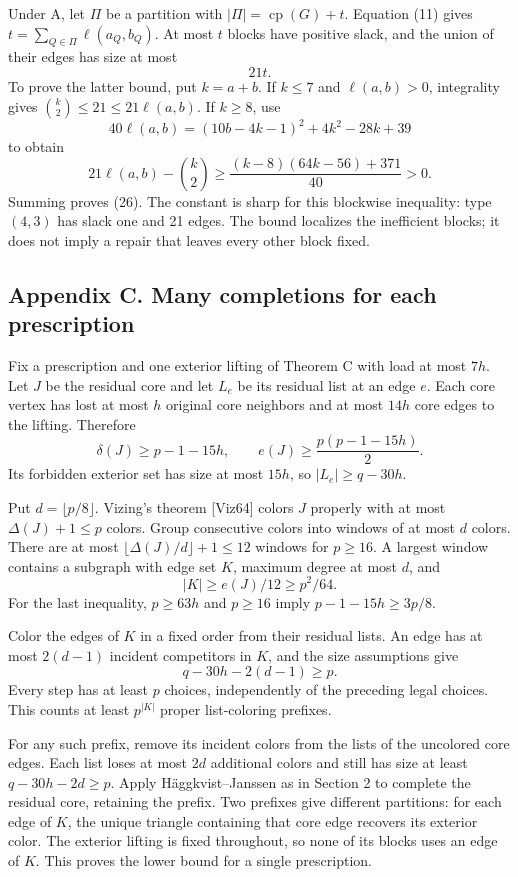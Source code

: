 \documentclass[english,11pt,a4paper]{article}
\newcounter{none}
\begin{document}
Under A, let \(\Pi\) be a partition with
\(|\Pi|=\operatorname{cp}(G)+t\). Equation (11) gives
\(t=\sum_{Q\in\Pi}\ell(a_Q,b_Q)\). At most \(t\) blocks have positive
slack, and the union of their edges has size at most \[
21t. \tag{26}
\] To prove the latter bound, put \(k=a+b\). If \(k\le7\) and
\(\ell(a,b)>0\), integrality gives \(\binom k2\le21\le21\ell(a,b)\). If
\(k\ge8\), use \[
40\ell(a,b)=(10b-4k-1)^2+4k^2-28k+39
\] to obtain \[
21\ell(a,b)-\binom k2
\ge\frac{(k-8)(64k-56)+371}{40}>0.
\] Summing proves (26). The constant is sharp for this blockwise
inequality: type \((4,3)\) has slack one and 21 edges. The bound
localizes the inefficient blocks; it does not imply a repair that leaves
every other block fixed.

\subsection{Appendix C. Many completions for each
prescription}\label{appendix-c.-many-completions-for-each-prescription}

Fix a prescription and one exterior lifting of Theorem C with load at
most \(7h\). Let \(J\) be the residual core and let \(L_e\) be its
residual list at an edge \(e\). Each core vertex has lost at most \(h\)
original core neighbors and at most \(14h\) core edges to the lifting.
Therefore \[
\delta(J)\ge p-1-15h,\qquad
e(J)\ge\frac{p(p-1-15h)}2.
\] Its forbidden exterior set has size at most \(15h\), so
\(|L_e|\ge q-30h\).

Put \(d=\lfloor p/8\rfloor\). Vizing's theorem {[}Viz64{]} colors \(J\)
properly with at most \(\Delta(J)+1\le p\) colors. Group consecutive
colors into windows of at most \(d\) colors. There are at most
\(\lfloor\Delta(J)/d\rfloor+1\le12\) windows for \(p\ge16\). A largest
window contains a subgraph with edge set \(K\), maximum degree at most
\(d\), and \[
|K|\ge e(J)/12\ge p^2/64.
\] For the last inequality, \(p\ge63h\) and \(p\ge16\) imply
\(p-1-15h\ge3p/8\).

Color the edges of \(K\) in a fixed order from their residual lists. An
edge has at most \(2(d-1)\) incident competitors in \(K\), and the size
assumptions give \[
q-30h-2(d-1)\ge p.
\] Every step has at least \(p\) choices, independently of the preceding
legal choices. This counts at least \(p^{|K|}\) proper list-coloring
prefixes.

For any such prefix, remove its incident colors from the lists of the
uncolored core edges. Each list loses at most \(2d\) additional colors
and still has size at least \(q-30h-2d\ge p\). Apply Häggkvist--Janssen
as in Section 2 to complete the residual core, retaining the prefix. Two
prefixes give different partitions: for each edge of \(K\), the unique
triangle containing that core edge recovers its exterior color. The
exterior lifting is fixed throughout, so none of its blocks uses an edge
of \(K\). This proves the lower bound for a single prescription.
\end{document}
